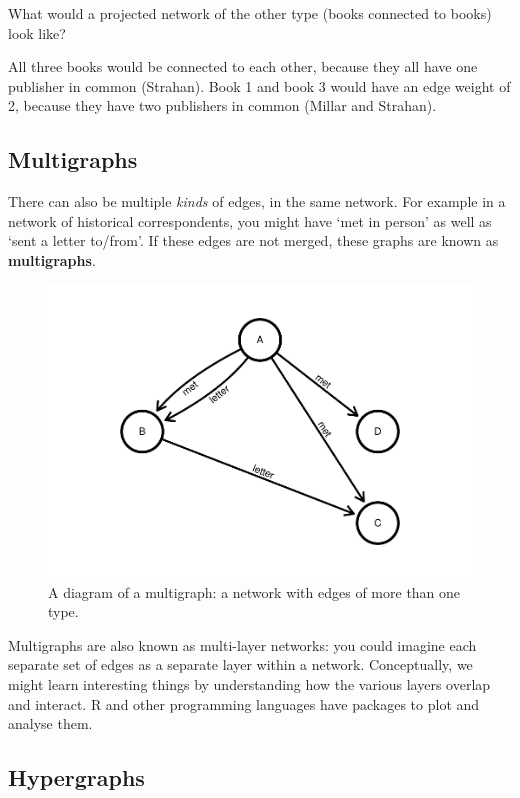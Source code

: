 \documentclass[
]{book}
\begin{document}
What would a projected network of the other type (books connected to books) look like?

All three books would be connected to each other, because they all have one publisher in common (Strahan). Book 1 and book 3 would have an edge weight of 2, because they have two publishers in common (Millar and Strahan).

\hypertarget{multigraphs}{%
\subsection{Multigraphs}\label{multigraphs}}

There can also be multiple \emph{kinds} of edges, in the same network. For example in a network of historical correspondents, you might have `met in person' as well as `sent a letter to/from'. If these edges are not merged, these graphs are known as \textbf{multigraphs}.

\begin{figure}
\centering
\includegraphics{_main_files/figure-latex/unnamed-chunk-2-1.pdf}
\caption{\label{fig:unnamed-chunk-2}A diagram of a multigraph: a network with edges of more than one type.}
\end{figure}

Multigraphs are also known as multi-layer networks: you could imagine each separate set of edges as a separate layer within a network. Conceptually, we might learn interesting things by understanding how the various layers overlap and interact. R and other programming languages have packages to plot and analyse them.

\hypertarget{hypergraphs}{%
\subsection{Hypergraphs}\label{hypergraphs}}
\end{document}

